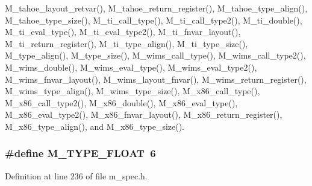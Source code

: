 M\_\-tahoe\_\-layout\_\-retvar(), M\_\-tahoe\_\-return\_\-register(), M\_\-tahoe\_\-type\_\-align(), M\_\-tahoe\_\-type\_\-size(), M\_\-ti\_\-call\_\-type(), M\_\-ti\_\-call\_\-type2(), M\_\-ti\_\-double(), M\_\-ti\_\-eval\_\-type(), M\_\-ti\_\-eval\_\-type2(), M\_\-ti\_\-fnvar\_\-layout(), M\_\-ti\_\-return\_\-register(), M\_\-ti\_\-type\_\-align(), M\_\-ti\_\-type\_\-size(), M\_\-type\_\-align(), M\_\-type\_\-size(), M\_\-wims\_\-call\_\-type(), M\_\-wims\_\-call\_\-type2(), M\_\-wims\_\-double(), M\_\-wims\_\-eval\_\-type(), M\_\-wims\_\-eval\_\-type2(), M\_\-wims\_\-fnvar\_\-layout(), M\_\-wims\_\-layout\_\-fnvar(), M\_\-wims\_\-return\_\-register(), M\_\-wims\_\-type\_\-align(), M\_\-wims\_\-type\_\-size(), M\_\-x86\_\-call\_\-type(), M\_\-x86\_\-call\_\-type2(), M\_\-x86\_\-double(), M\_\-x86\_\-eval\_\-type(), M\_\-x86\_\-eval\_\-type2(), M\_\-x86\_\-fnvar\_\-layout(), M\_\-x86\_\-return\_\-register(), M\_\-x86\_\-type\_\-align(), and M\_\-x86\_\-type\_\-size().
\subsubsection{\setlength{\rightskip}{0pt plus 5cm}\#define M\_\-TYPE\_\-FLOAT~6}\label{m__spec_8h_f988859277ae88a5fd52e40e5d0cc59e}




Definition at line 236 of file m\_\-spec.h.

